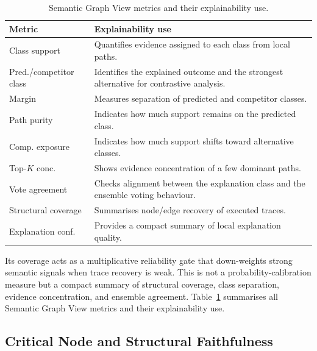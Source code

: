 \documentclass[runningheads]{llncs}
\begin{document}
\begin{table}[h!]
\centering
\small
\caption{Semantic Graph View metrics and their explainability use.}
\label{tab:semantic-metrics}
\setlength{\tabcolsep}{5pt}
\begin{tabular}{p{2.8cm} p{8.0cm}}
\toprule
Metric & Explainability use \\
\midrule
Class support & Quantifies evidence assigned to each class from local paths. \\
\addlinespace[1pt]
Pred./competitor class & Identifies the explained outcome and the strongest alternative for contrastive analysis. \\
\addlinespace[1pt]
Margin & Measures separation of predicted and competitor classes. \\
\addlinespace[1pt]
Path purity & Indicates how much support remains on the predicted class. \\
\addlinespace[1pt]
Comp. exposure & Indicates how much support shifts toward alternative classes. \\
\addlinespace[1pt]
Top-$K$ conc. & Shows evidence concentration of a few dominant paths. \\
\addlinespace[1pt]
Vote agreement & Checks alignment between the explanation class and the ensemble voting behaviour. \\
\addlinespace[1pt]
Structural coverage & Summarises node/edge recovery of executed traces. \\
\addlinespace[1pt]
Explanation conf. & Provides a compact summary of local explanation quality. \\
\bottomrule
\end{tabular}
\end{table}

Its coverage acts as a multiplicative reliability gate that down-weights strong semantic signals when trace recovery is weak.
This is not a probability-calibration measure but a compact summary of structural coverage, class separation, evidence concentration, and ensemble agreement. Table~\ref{tab:semantic-metrics} summarises all Semantic Graph View metrics and their explainability use.






\subsection{Critical Node and Structural Faithfulness}
\label{sec:structural-faithfulness}
\end{document}
